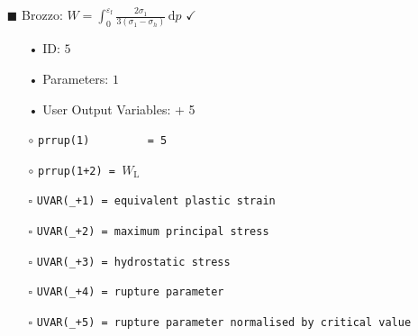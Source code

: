 \documentclass[11pt,a4paper,twoside,final,onecolumn,titlepage]{article}
\newcommand{\verified}{\hspace{0.5pt} {\LARGE $\checkmark$}}
\begin{document}
\begin{itemize}
	\item[\tiny$\blacksquare$] Brozzo: $\displaystyle W =  \int_{0}^{\varepsilon_\textrm{f}}\frac{2\sigma_{1}}{3\left(\sigma_{1}-\sigma_{h}\right)}\,\text{d}p$ \verified{}
	\begin{itemize}
		\item[•] ID: $5$
		\item[•] Parameters: $1$
		\item[•] User Output Variables: + 5\\
		\item[$\circ$] \texttt{prrup(1)\,\,\,\,\,\,\,\,\,= 5}
		\item[$\circ$] \texttt{prrup(1+2) = $W_\textrm{L}$}\\
		\item[\tiny$\square$] \texttt{UVAR(\_+1) = equivalent plastic strain}
		\item[\tiny$\square$] \texttt{UVAR(\_+2) = maximum principal stress}
		\item[\tiny$\square$] \texttt{UVAR(\_+3) = hydrostatic stress}
		\item[\tiny$\square$] \texttt{UVAR(\_+4) = rupture parameter}
		\item[\tiny$\square$] \texttt{UVAR(\_+5) = rupture parameter normalised by critical value}\\
	\end{itemize}
\end{itemize}
\end{document}
